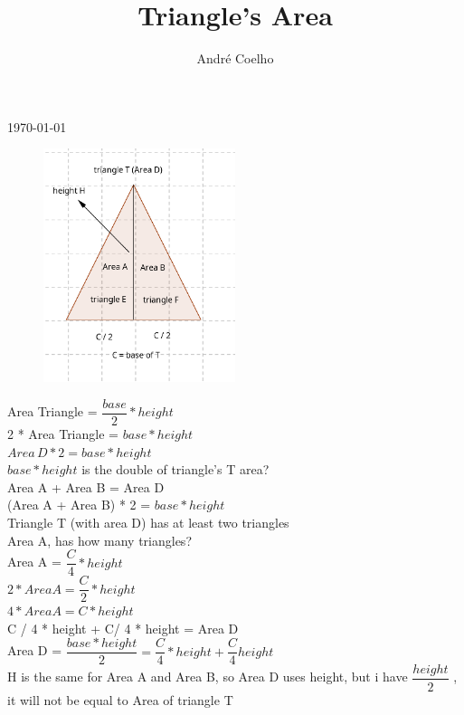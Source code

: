 \documentclass[14pt]{extarticle}
\title{Triangle's Area}
\author{André Coelho}
\begin{document}
\today
\maketitle




\begin{figure}[h]
\centering
  \includegraphics[width=0.5\textwidth]{triangle_area}
\end{figure}
 
 \begin{center}



Area Triangle = $ \dfrac{base}{2} * height $ \\[1cm]


2 * Area Triangle = $  base * height $ \\[1cm]
$Area\, D * 2 = base * height $ \\[1cm]
$base * height $ is the double of triangle's T area? \\[1cm]
Area A + Area B = Area D \\[1cm]
(Area A + Area B) * 2 = $ base * height $  \\[1cm]

Triangle T (with area D) has at least two triangles  \\[1cm]

Area A, has how many triangles?  \\[1cm]

Area A = $ \dfrac{C}{4} * height $  \\[1cm]

$ 2 * Area A = \dfrac{C}{2}  * height $  \\[1cm]

$ 4 * Area A = C * height $  \\[1cm]

C / 4 * height + C/ 4 * height = Area D  \\[1cm]

Area D = $ \dfrac{base * height}{2} = \dfrac{C}{4}  * height + \dfrac{C}{4} height $  \\[1cm]

H is the same for Area A and Area B, so Area D uses height,  but i have \( \dfrac{height}{2} \) , it will not be equal to Area of triangle T  \\[1cm]

\end{center}
\end{document}
